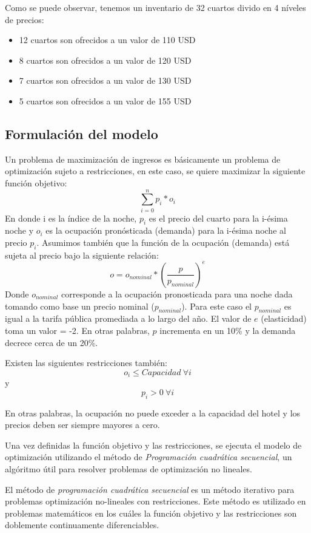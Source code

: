 Como se puede observar, tenemos un inventario de 32 cuartos divido en 4 níveles de precios:
\begin{itemize}[noitemsep]
\item 12 cuartos son ofrecidos a un valor de 110 USD
\item 8 cuartos son ofrecidos a un valor de 120 USD
\item 7 cuartos son ofrecidos a un valor de 130 USD
\item 5 cuartos son ofrecidos a un valor de 155 USD
\end{itemize}

\subsection*{Formulación del modelo}

Un problema de maximización de ingresos es básicamente un problema de optimización sujeto a restricciones, en este caso, se quiere maximizar la siguiente función objetivo:
$$\sum_{i=0}^{n}p_i*o_i$$
En donde i es la índice de la noche, $p_i$ es el precio del cuarto para la i-ésima noche y $o_i$ es la ocupación pronósticada (demanda) para la i-ésima noche al precio $p_i$. Asumimos también que la función de la ocupación (demanda) está sujeta al precio bajo la siguiente relación:
$$o = o_{nominal} * (\frac{p}{p_{nominal}})^e$$
Donde $o_{nominal}$ corresponde a la ocupación pronosticada para una noche dada tomando como base un precio nominal ($p_{nominal}$). Para este caso el $p_{nominal}$ es igual a la tarifa pública promediada a lo largo del año. El valor de $e$ (elasticidad) toma un valor = -2. En otras palabras, $p$ incrementa en un 10\% y la demanda decrece cerca de un 20\%.

Existen las siguientes restricciones también: $$o_i \leq Capacidad\ \forall i$$ y $$p_i > 0\ \forall i$$

En otras palabras, la ocupación no puede exceder a la capacidad del hotel y los precios deben ser siempre mayores a cero.

Una vez definidas la función objetivo y las restricciones, se ejecuta el modelo de optimización utilizando el método de \emph{Programación cuadrática secuencial}, un algóritmo útil para resolver problemas de optimización no lineales.

El método de \emph{programación cuadrática secuencial} es un método iterativo para problemas optimización no-lineales con restricciones. Este método es utilizado en problemas matemáticos en los cuáles la función objetivo y las restricciones son doblemente continuamente diferenciables.

